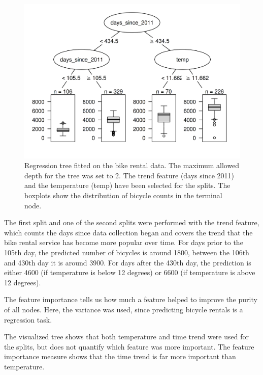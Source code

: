 \documentclass[12pt,]{krantz}
\begin{document}
\begin{figure}

{\centering \includegraphics[width=\textwidth]{images/tree-example-1} 

}

\caption{Regression tree fitted on the bike rental data. The maximum allowed depth for the tree was set to 2. The trend feature (days since 2011) and the temperature (temp) have been selected for the splits. The boxplots show the distribution of bicycle counts in the terminal node.}\label{fig:tree-example}
\end{figure}

The first split and one of the second splits were performed with the
trend feature, which counts the days since data collection began and
covers the trend that the bike rental service has become more popular
over time. For days prior to the 105th day, the predicted number of
bicycles is around 1800, between the 106th and 430th day it is around
3900. For days after the 430th day, the prediction is either 4600 (if
temperature is below 12 degrees) or 6600 (if temperature is above 12
degrees).

The feature importance tells us how much a feature helped to improve the
purity of all nodes. Here, the variance was used, since predicting
bicycle rentals is a regression task.

The visualized tree shows that both temperature and time trend were used
for the splits, but does not quantify which feature was more important.
The feature importance measure shows that the time trend is far more
important than temperature.
\end{document}
